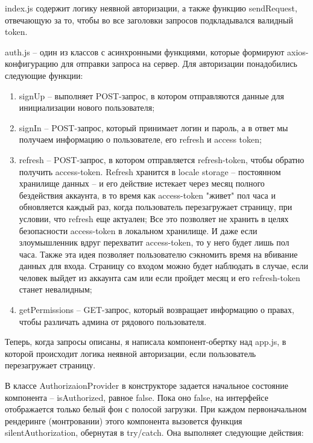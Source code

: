 \documentclass[a4paper,12pt]{diplom}
\begin{document}
index.js содержит логику неявной авторизации, а также функцию sendRequest, отвечающую за то, чтобы во все заголовки запросов подкладывался валидный token.

auth.js -- один из классов с асинхронными функциями, которые формируют axios-конфигурацию для отправки запроса на сервер.
Для авторизации понадобились следующие функции:

\begin{enumerate}
  \item signUp -- выполняет POST-запрос, в котором отправляются данные для инициализации нового пользователя;
  \item signIn -- POST-запрос, который принимает логин и пароль, а в ответ мы получаем информацию о пользователе, его refresh и access token;
  \item refresh -- POST-запрос, в котором отправляется refresh-token, чтобы обратно получить access-token. Refresh хранится в locale storage -- постоянном хранилище данных --
  и его действие истекает через месяц полного бездействия аккаунта, в то время как access-token "живет" пол часа и обновляется каждый раз, когда пользователь перезагружает страницу, при условии, что refresh еще актуален;
  Все это позволяет не хранить в целях безопасности access-token в локальном хранилище. И даже если злоумышленник вдруг перехватит access-token, то у него будет лишь пол часа. Также эта идея позволяет пользователю сэкномить время на вбивание данных для входа. Страницу со входом можно будет наблюдать в случае, если человек выйдет из аккаунта сам или если пройдет месяц и его refresh-token станет невалидным;
  \item getPermissions -- GET-запрос, который возвращает информацию о правах, чтобы различать админа от рядового пользователя.

\end{enumerate}

Теперь, когда запросы описаны, я написала компонент-обертку над app.js, в которой происходит логика неявной авторизации, если пользователь перезагружает страницу.

В классе AuthorizaionProvider в конструкторе задается начальное состояние компонента -- isAuthorized, равное false. Пока оно false, на интерфейсе отображается только белый фон с полосой загрузки. При каждом первоначальном рендеринге (монтровании) этого компонента
вызовется функция silentAuthorization, обернутая в try/catch. Она выполняет следующие действия:
\end{document}
